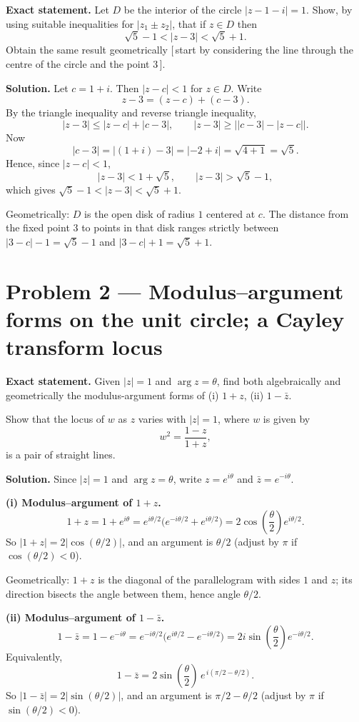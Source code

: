\documentclass[12pt,a4paper]{article}
\theoremstyle{plain}
\theoremstyle{definition}      %
\begin{document}
\textbf{Exact statement.}
Let \(D\) be the interior of the circle \(|z-1-i|=1\). Show, by using suitable inequalities for \(|z_1\pm z_2|\), that
if \(z\in D\) then
\[
\sqrt5-1<|z-3|<\sqrt5+1.
\]
Obtain the same result geometrically \([\,\)start by considering the line through the centre of the circle and the point \(3\,]\).

\textbf{Solution.}
Let \(c=1+i\). Then \(|z-c|<1\) for \(z\in D\). Write
\[
z-3=(z-c)+(c-3).
\]
By the triangle inequality and reverse triangle inequality,
\[
|z-3|\le |z-c|+|c-3|,\qquad |z-3|\ge \bigl||c-3|-|z-c|\bigr|.
\]
Now
\[
|c-3|=|(1+i)-3|=|-2+i|=\sqrt{4+1}=\sqrt5.
\]
Hence, since \(|z-c|<1\),
\[
|z-3|<1+\sqrt5,\qquad |z-3|>\sqrt5-1,
\]
which gives \(\sqrt5-1<|z-3|<\sqrt5+1\).

Geometrically: \(D\) is the open disk of radius \(1\) centered at \(c\). The distance from the fixed point \(3\) to points in that disk ranges strictly between \(|3-c|-1=\sqrt5-1\) and \(|3-c|+1=\sqrt5+1\).


\section*{Problem 2 — Modulus–argument forms on the unit circle; a Cayley transform locus}

\textbf{Exact statement.}
Given \(|z|=1\) and \(\arg z=\theta\), find both algebraically and geometrically the modulus-argument forms of
(i) \(1+z\), (ii) \(1-\bar z\).

Show that the locus of \(w\) as \(z\) varies with \(|z|=1\), where \(w\) is given by
\[
w^2=\frac{1-z}{1+z},
\]
is a pair of straight lines.

\textbf{Solution.}
Since \(|z|=1\) and \(\arg z=\theta\), write \(z=e^{i\theta}\) and \(\bar z=e^{-i\theta}\).

\medskip
\noindent\textbf{(i) Modulus–argument of \(1+z\).}
\[
1+z=1+e^{i\theta}=e^{i\theta/2}\bigl(e^{-i\theta/2}+e^{i\theta/2}\bigr)
=2\cos\!\left(\frac\theta2\right)e^{i\theta/2}.
\]
So \(|1+z|=2\bigl|\cos(\theta/2)\bigr|\), and an argument is \(\theta/2\) (adjust by \(\pi\) if \(\cos(\theta/2)<0\)).

Geometrically: \(1+z\) is the diagonal of the parallelogram with sides \(1\) and \(z\); its direction bisects the angle between them, hence angle \(\theta/2\).

\medskip
\noindent\textbf{(ii) Modulus–argument of \(1-\bar z\).}
\[
1-\bar z = 1-e^{-i\theta}
= e^{-i\theta/2}\bigl(e^{i\theta/2}-e^{-i\theta/2}\bigr)
=2i\sin\!\left(\frac\theta2\right)e^{-i\theta/2}.
\]
Equivalently,
\[
1-\bar z = 2\sin\!\left(\frac\theta2\right)\,e^{\,i(\pi/2-\theta/2)}.
\]
So \(|1-\bar z|=2\bigl|\sin(\theta/2)\bigr|\), and an argument is \(\pi/2-\theta/2\) (adjust by \(\pi\) if \(\sin(\theta/2)<0\)).
\end{document}
